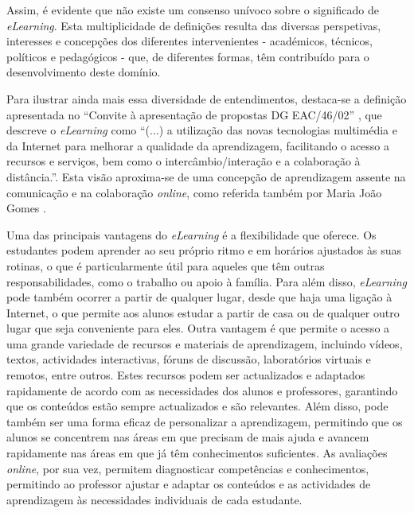 Assim, é evidente que não existe um consenso unívoco sobre o significado de \textit{eLearning}. Esta multiplicidade de definições resulta das diversas perspetivas, interesses e concepções dos diferentes intervenientes - académicos, técnicos, políticos e pedagógicos - que, de diferentes formas, têm contribuído para o desenvolvimento deste domínio.

Para ilustrar ainda mais essa diversidade de entendimentos, destaca-se a definição apresentada no ``Convite à apresentação de propostas DG EAC/46/02'' \cite{comissao197_07}, que descreve o \textit{eLearning} como ``(...) a utilização das novas tecnologias multimédia e da Internet para melhorar a qualidade da aprendizagem, facilitando o acesso a recursos e serviços, bem como o intercâmbio/interação e a colaboração à distância.''. Esta visão aproxima-se de uma concepção de aprendizagem assente na comunicação e na colaboração \textit{online}, como referida também por Maria João Gomes \cite{gomes_e-learning_2005}.

Uma das principais vantagens do \textit{eLearning} é a flexibilidade que oferece. Os estudantes podem aprender ao seu próprio ritmo e em horários ajustados às suas rotinas, o que é particularmente útil para aqueles que têm outras responsabilidades, como o trabalho ou apoio à família. Para além disso, \textit{eLearning} pode também ocorrer a partir de qualquer lugar, desde que haja uma ligação à Internet, o que permite aos alunos estudar a partir de casa ou de qualquer outro lugar que seja conveniente para eles. Outra vantagem é que permite o acesso a uma grande variedade de recursos e materiais de aprendizagem, incluindo vídeos, textos, actividades interactivas, fóruns de discussão, laboratórios virtuais e remotos, entre outros. Estes recursos podem ser actualizados e adaptados rapidamente de acordo com as necessidades dos alunos e professores, garantindo que os conteúdos estão sempre actualizados e são relevantes. Além disso, pode também ser uma forma eficaz de personalizar a aprendizagem, permitindo que os alunos se concentrem nas áreas em que precisam de mais ajuda e avancem rapidamente nas áreas em que já têm conhecimentos suficientes. As avaliações \textit{online}, por sua vez, permitem diagnosticar competências e conhecimentos, permitindo ao professor ajustar e adaptar os conteúdos e as actividades de aprendizagem às necessidades individuais de cada estudante.

